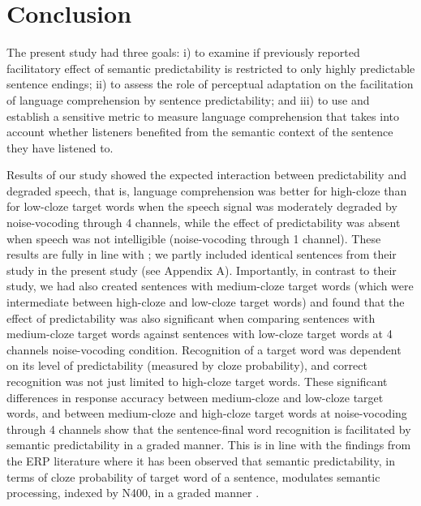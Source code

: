 \documentclass[a4paper, nobind]{templates/ociamthesis}
\begin{document}
\hypertarget{conclusion-1}{%
\section{Conclusion}\label{conclusion-1}}

The present study had three goals: i) to examine if previously reported facilitatory effect of semantic predictability is restricted to only highly predictable sentence endings;
ii) to assess the role of perceptual adaptation on the facilitation of language comprehension by sentence predictability; and
iii) to use and establish a sensitive metric to measure language comprehension that takes into account whether listeners benefited from the semantic context of the sentence they have listened to.

Results of our study showed the expected interaction between predictability and degraded speech, that is, language comprehension was better for high-cloze than for low-cloze target words when the speech signal was moderately degraded by noise-vocoding through 4 channels, while the effect of predictability was absent when speech was not intelligible (noise-vocoding through 1 channel).
These results are fully in line with \textcite{Obleser2010};
we partly included identical sentences from their study in the present study (see Appendix A).
Importantly, in contrast to their study, we had also created sentences with medium-cloze target words (which were intermediate between high-cloze and low-cloze target words) and found that the effect of predictability was also significant when comparing sentences with medium-cloze target words against sentences with low-cloze target words at 4 channels noise-vocoding condition.
Recognition of a target word was dependent on its level of predictability (measured by cloze probability), and correct recognition was not just limited to high-cloze target words.
These significant differences in response accuracy between medium-cloze and low-cloze target words, and between medium-cloze and high-cloze target words at noise-vocoding through 4 channels show that the sentence-final word recognition is facilitated by semantic predictability in a graded manner.
This is in line with the findings from the ERP literature where it has been observed that semantic predictability, in terms of cloze probability of target word of a sentence, modulates semantic processing, indexed by N400, in a graded manner \autocite{Delong2005,Wlotko2012,Nieuwland2018}.
\end{document}
